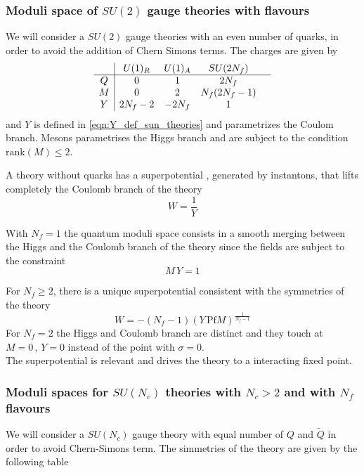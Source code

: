 \subsubsection{Moduli space of $SU(2)$ gauge theories with flavours}

We will consider a $SU(2) $ gauge theories with an even number of quarks, in order to avoid the addition of Chern Simons terms.
The charges are given by
\begin{equation}
 \begin{array}{ c | c c c  c }
  & U(1)_R  & U(1)_A & SU(2 N_f)\\
 \hline
 Q & 0  & 1 & 2 N_f \\  
   M & 0 & 2 & N_f (2 N_f-1)  & \\  
   Y & 2 N_f  -2 &  - 2 N_f & 1 \\
 \end{array}
\end{equation}
and $Y$ is defined in \eqref{eqn:Y_def_sun_theories} and parametrizes the Coulom branch.
Mesons parametrises the Higgs branch and are subject to the condition $\mathrm{rank}(M) \leq 2 $.

A theory without quarks has a superpotential \cite{Affleck:1982as}, generated by instantons, that lifts completely the Coulomb branch of the theory
\begin{equation}
W = \frac{1}{Y}
\end{equation}

With $N_f = 1$ the quantum moduli space consists in a smooth merging between the Higgs and the Coulomb branch of the theory since the fields are subject to the constraint
\begin{equation}
 M \, Y = 1
\end{equation}

For $N_f \geq 2 $, there is a unique superpotential consistent with the symmetries of the theory
\begin{equation}
 W = - (N_f -1 )( Y \, \mathrm{Pf} M)^{\frac{1}{N_f -1}}
\end{equation}
For $N_f = 2$ the Higgs and Coulomb branch are distinct and they touch at $M=0 \, , \, Y=0$ instead of the point with $\sigma = 0$.	\\
The superpotential is relevant and drives the theory to a interacting fixed point.

\subsubsection{Moduli spaces for $SU(N_c)$ theories with $N_c >2 $ and with $N_f$ flavours }
We will consider a $SU(N_c)$ gauge theory with equal number of $Q$ and $\tilde{Q}$ in order to avoid Chern-Simons term. 
The simmetries of the theory are given by the following table

